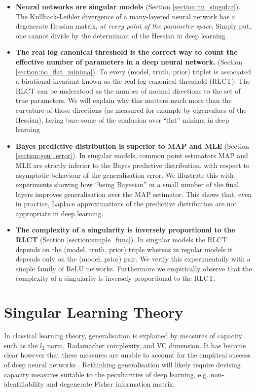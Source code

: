 \documentclass{article} %
\begin{document}
\begin{itemize}
    \item \textbf{Neural networks are singular models} (Section \ref{section:nn_singular}). The Kullback-Leibler divergence of a many-layered neural network has a degenerate Hessian matrix, \emph{at every point of the parameter space}. Simply put, one cannot divide by the determinant of the Hessian in deep learning.
    \item \textbf{The real log canonical threshold is the correct way to count the effective number of parameters in a deep neural network.} (Section \ref{section:no_flat_minima}). 
    To every (model, truth, prior) triplet is associated a birational invariant known as the real log canonical threshold (RLCT). The RLCT can be understood as the number of normal directions to the set of true parameters. We will explain why this matters much more than the curvature of those directions (as measured for example by eigenvalues of the Hessian), laying bare some of the confusion over ``flat'' minima in deep learning 
    \item \textbf{Bayes predictive distribution is superior to MAP and MLE} (Section \ref{section:gen_error}). In singular models, common point estimators MAP and MLE are strictly inferior to the Bayes predictive distribution, with respect to asymptotic behaviour of the generalisation error. We illustrate this with experiments showing how ``being Bayesian'' in a small number of the final layers improves generalisation over the MAP estimator. This shows that, even in practice, Laplace approximations of the predictive distribution are not appropriate in deep learning.
    \item \textbf{The complexity of a singularity is inversely proportional to the RLCT} (Section \ref{section:simple_func}). In singular models the RLCT depends on the (model, truth, prior) triple whereas in regular models it depends only on the (model, prior) pair.
     We verify this experimentally with a simple family of ReLU networks. Furthermore we empirically observe that the complexity of a singularity is inversely proportional to the RLCT.
\end{itemize}

\section{Singular Learning Theory}

In classical learning theory, generalisation is explained by measures of capacity such as the $l_2$ norm, Radamacher complexity, and VC dimension. It has become clear however that these measures are unable to account for the empirical success of deep neural networks \citep{zhang_understanding_2017}. Rethinking generalisation will likely require devising capacity measures suitable to the peculiarities of deep learning, e.g. non-identifiability and degenerate Fisher information matrix. 
\end{document}
